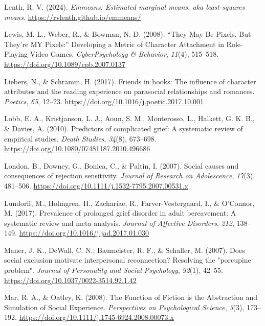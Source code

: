 \documentclass[
]{udthesis}
\newlength{\cslhangindent}
\newenvironment{CSLReferences}[2] %
 {\begin{list}{}{%
  \setlength{\itemindent}{0pt}
  \setlength{\leftmargin}{0pt}
  \setlength{\parsep}{0pt}
  \ifodd #1
   \setlength{\leftmargin}{\cslhangindent}
   \setlength{\itemindent}{-1\cslhangindent}
  \fi
  \setlength{\itemsep}{#2\baselineskip}}}
 {\end{list}}
\begin{document}
\begin{CSLReferences}{1}{0}
Lenth, R. V. (2024). \emph{Emmeans: Estimated marginal means, aka least-squares means}. \url{https://rvlenth.github.io/emmeans/}

Lewis, M. L., Weber, R., \& Bowman, N. D. (2008). {``}They May Be Pixels, But They're MY Pixels:{''} Developing a Metric of Character Attachment in Role-Playing Video Games. \emph{CyberPsychology \& Behavior}, \emph{11}(4), 515--518. \url{https://doi.org/10.1089/cpb.2007.0137}

Liebers, N., \& Schramm, H. (2017). Friends in books: The influence of character attributes and the reading experience on parasocial relationships and romances. \emph{Poetics}, \emph{65}, 12--23. \url{https://doi.org/10.1016/j.poetic.2017.10.001}

Lobb, E. A., Kristjanson, L. J., Aoun, S. M., Monterosso, L., Halkett, G. K. B., \& Davies, A. (2010). Predictors of complicated grief: A systematic review of empirical studies. \emph{Death Studies}, \emph{34}(8), 673--698. \url{https://doi.org/10.1080/07481187.2010.496686}

London, B., Downey, G., Bonica, C., \& Paltin, I. (2007). Social causes and consequences of rejection sensitivity. \emph{Journal of Research on Adolescence}, \emph{17}(3), 481--506. \url{https://doi.org/10.1111/j.1532-7795.2007.00531.x}

Lundorff, M., Holmgren, H., Zachariae, R., Farver-Vestergaard, I., \& O'Connor, M. (2017). Prevalence of prolonged grief disorder in adult bereavement: A systematic review and meta-analysis. \emph{Journal of Affective Disorders}, \emph{212}, 138--149. \url{https://doi.org/10.1016/j.jad.2017.01.030}

Maner, J. K., DeWall, C. N., Baumeister, R. F., \& Schaller, M. (2007). Does social exclusion motivate interpersonal reconnection? {Resolving} the {"}porcupine problem{"}. \emph{Journal of Personality and Social Psychology}, \emph{92}(1), 42--55. \url{https://doi.org/10.1037/0022-3514.92.1.42}

Mar, R. A., \& Oatley, K. (2008). The Function of Fiction is the Abstraction and Simulation of Social Experience. \emph{Perspectives on Psychological Science}, \emph{3}(3), 173--192. \url{https://doi.org/10.1111/j.1745-6924.2008.00073.x}


\end{CSLReferences}
\end{document}
